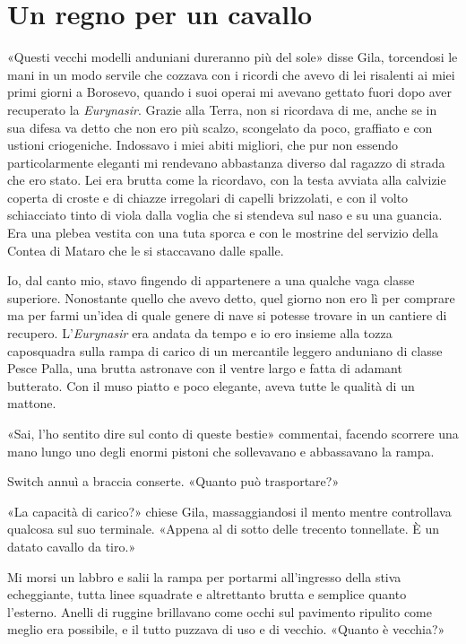 \chapter{Un regno per un cavallo}

«Questi vecchi modelli anduniani dureranno più del sole» disse Gila,
torcendosi le mani in un modo servile che cozzava con i ricordi che
avevo di lei risalenti ai miei primi giorni a Borosevo, quando i suoi
operai mi avevano gettato fuori dopo aver recuperato la
\emph{Eurynasir}. Grazie alla Terra, non si ricordava di me, anche se in
sua difesa va detto che non ero più scalzo, scongelato da poco,
graffiato e con ustioni criogeniche. Indossavo i miei abiti migliori,
che pur non essendo particolarmente eleganti mi rendevano abbastanza
diverso dal ragazzo di strada che ero stato. Lei era brutta come la
ricordavo, con la testa avviata alla calvizie coperta di croste e di
chiazze irregolari di capelli brizzolati, e con il volto schiacciato
tinto di viola dalla voglia che si stendeva sul naso e su una guancia.
Era una plebea vestita con una tuta sporca e con le mostrine del
servizio della Contea di Mataro che le si staccavano dalle spalle.

Io, dal canto mio, stavo fingendo di appartenere a una qualche vaga
classe superiore. Nonostante quello che avevo detto, quel giorno non ero
lì per comprare ma per farmi un'idea di quale genere di nave si potesse
trovare in un cantiere di recupero. L'\emph{Eurynasir} era andata da
tempo e io ero insieme alla tozza caposquadra sulla rampa di carico di
un mercantile leggero anduniano di classe Pesce Palla, una brutta
astronave con il ventre largo e fatta di adamant butterato. Con il muso
piatto e poco elegante, aveva tutte le qualità di un mattone.

«Sai, l'ho sentito dire sul conto di queste bestie» commentai, {facendo}
scorrere una mano lungo uno degli enormi pistoni che sollevavano e
abbassavano la rampa.

Switch annuì a braccia conserte. «Quanto può trasportare?»

«La capacità di carico?» chiese Gila, massaggiandosi il mento mentre
controllava qualcosa sul suo terminale. «Appena al di sotto delle
trecento tonnellate. È un datato cavallo da tiro.»

Mi morsi un labbro e salii la rampa per portarmi all'ingresso della
stiva echeggiante, tutta linee squadrate e altrettanto brutta e semplice
quanto l'esterno. Anelli di ruggine brillavano come occhi sul pavimento
ripulito come meglio era possibile, e il tutto puzzava di uso e di
vecchio. «Quanto è vecchia?»

